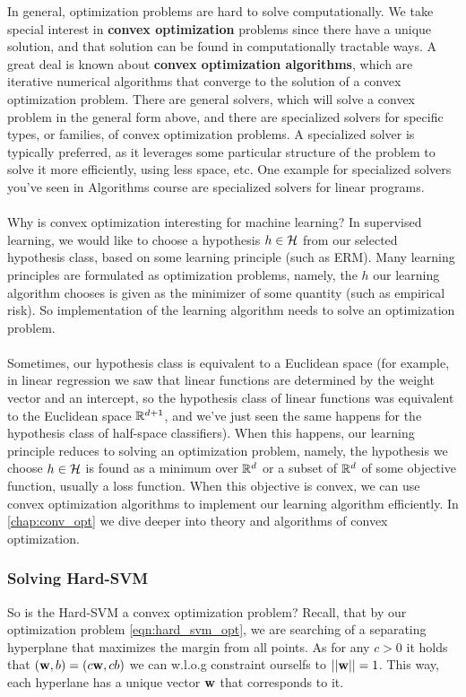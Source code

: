 In general, optimization problems are hard to solve computationally. We take special interest in \textbf{convex optimization} problems since there have a unique solution, and that solution can be found in  computationally tractable ways. A great deal is known about \textbf{convex optimization algorithms}, which are iterative numerical algorithms that converge to the solution of a convex optimization problem. There are general solvers, which will solve a convex problem in the general form above, and there are specialized solvers for specific types, or families, of convex optimization problems. A specialized solver is typically preferred, as it leverages some particular structure of the problem to solve it more efficiently, using less space, etc. One example for specialized solvers you've seen in Algorithms course are specialized solvers for linear programs.
\\~\\
Why is convex optimization interesting for machine learning? In supervised learning, we would like to choose a hypothesis $h\in\mathcal{H}$ from our selected hypothesis class, based on some learning principle (such as ERM). Many learning principles are formulated as optimization problems, namely, the $h$ our learning algorithm chooses is given as the minimizer of some quantity (such as empirical risk). So implementation of the learning algorithm needs to solve an optimization problem. 
\\~\\
Sometimes, our hypothesis class is equivalent to a Euclidean space (for example, in linear regression we saw that linear functions are determined by the weight vector and an intercept, so the hypothesis class of linear functions was equivalent to the Euclidean space $\mathbb{R}^{d+1}$, and we've just seen the same happens for the hypothesis class of half-space classifiers). When this happens, our learning principle reduces to solving an optimization problem, namely, the hypothesis we choose $h\in\mathcal{H}$ is found as a minimum over $\mathbb{R}^d$ or a subset of $\mathbb{R}^d$ of some objective function, usually a loss function. When this objective is convex, we can use convex optimization algorithms to implement our learning algorithm efficiently. In \autoref{chap:conv_opt} we dive deeper into theory and algorithms of convex optimization.


\subsubsection{Solving Hard-SVM}
So is the Hard-SVM a convex optimization problem? Recall, that by our optimization problem \ref{eqn:hard_svm_opt}, we are searching of a separating hyperplane that maximizes the margin from all points. As for any $c>0$ it holds that $\left(\mathbf{w},b\right)=\left(c\mathbf{w},cb\right)$ we can w.l.o.g constraint ourselfs to $\left|\left| \mathbf{w}\right|\right|=1$. This way, each hyperlane has a unique vector $\mathbf{w}$ that corresponds to it.


